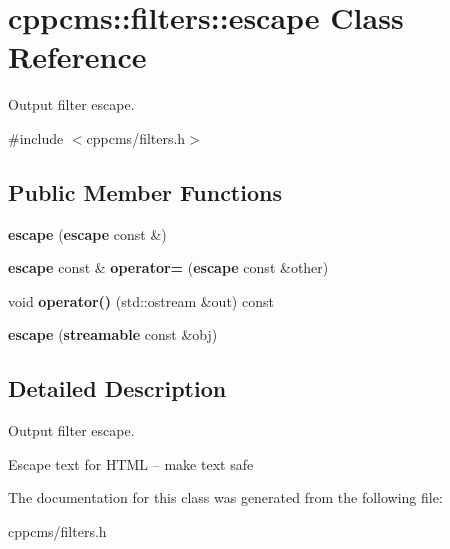 \section{cppcms\-:\-:filters\-:\-:escape Class Reference}
\label{classcppcms_1_1filters_1_1escape}


Output filter escape.  




{\ttfamily \#include $<$cppcms/filters.\-h$>$}

\subsection*{Public Member Functions}
\begin{DoxyCompactItemize}
\item 
{\bfseries escape} ({\bf escape} const \&)\label{classcppcms_1_1filters_1_1escape_ae128f6c05b231a7424fc2323c39c8a82}

\item 
{\bf escape} const \& {\bfseries operator=} ({\bf escape} const \&other)\label{classcppcms_1_1filters_1_1escape_abcb45f1775b294e902895e04400a33a1}

\item 
void {\bfseries operator()} (std\-::ostream \&out) const \label{classcppcms_1_1filters_1_1escape_ad3dc5ca2d4592d2aada15b8e69604ad1}

\item 
{\bfseries escape} ({\bf streamable} const \&obj)\label{classcppcms_1_1filters_1_1escape_a4995eb58124be3c31c09a3fcfa3599da}

\end{DoxyCompactItemize}


\subsection{Detailed Description}
Output filter escape. 

Escape text for H\-T\-M\-L -- make text safe 

The documentation for this class was generated from the following file\-:\begin{DoxyCompactItemize}
\item 
cppcms/filters.\-h\end{DoxyCompactItemize}
